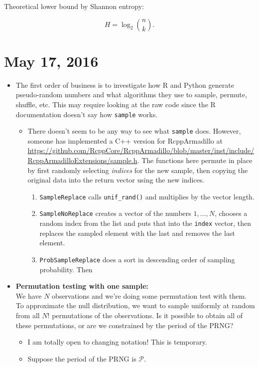 \documentclass[12pt]{article}
\begin{document}
Theoretical lower bound by Shannon entropy:

$$ H = \log_2 {{n} \choose {k}}.$$


\section{May 17, 2016}
\begin{itemize}
\item The first order of business is to investigate how R and Python generate pseudo-random numbers and
what algorithms they use to sample, permute, shuffle, etc.
This may require looking at the raw code since the R documentation doesn't say how \texttt{sample} works.
\begin{itemize}
\item There doesn't seem to be any way to see what \texttt{sample} does.
However, someone has implemented a C++ version for RcppArmadillo at \url{https://github.com/RcppCore/RcppArmadillo/blob/master/inst/include/RcppArmadilloExtensions/sample.h}.
The functions here permute in place by first randomly selecting \textit{indices} for the new sample, then copying the original data into the return vector using the new indices.
\begin{enumerate}
\item \texttt{SampleReplace} calls \texttt{unif\_rand()} and multiplies by the vector length.
\item \texttt{SampleNoReplace} creates a vector of the numbers $1, \dots, N$, chooses a random index from the list and puts that into the \texttt{index} vector, then replaces the sampled element with the last and removes the last element.
\item \texttt{ProbSampleReplace} does a sort in descending order of sampling probability. Then
\end{enumerate}
\end{itemize}
\item \textbf{Permutation testing with one sample:} \\
We have $N$ observations and we're doing some permutation test with them.
To approximate the null distribution, we want to sample uniformly at random from all $N!$ permutations of the observations.
Is it possible to obtain all of these permutations, or are we constrained by the period of the PRNG?
\begin{itemize}
\item I am totally open to changing notation! This is temporary.
\item Suppose the period of the PRNG is $\mathcal{P}$.

\end{itemize}
\end{itemize}
\end{document}
